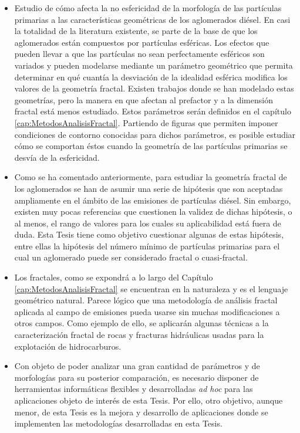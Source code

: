 \begin{itemize}
	
	\item Estudio de cómo afecta la no esfericidad de la morfología de las partículas primarias a las características geométricas de los aglomerados diésel. En casi la totalidad de la literatura existente, se parte de la base de que los aglomerados están compuestos por partículas esféricas. Los efectos que pueden llevar a que las partículas no sean perfectamente esféricos son variados y pueden modelarse mediante un parámetro geométrico que permita determinar en qué cuantía la desviación de la idealidad esférica modifica los valores de la geometría fractal. Existen trabajos donde se han modelado estas geometrías, pero la manera en que afectan al prefactor y a la dimensión fractal está menos estudiado. Estos parámetros serán definidos en el capítulo \ref{cap:MetodosAnalisisFractal}. Partiendo de figuras que permiten imponer condiciones de contorno conocidas para dichos parámetros, es posible estudiar cómo se comportan éstos cuando la geometría de las partículas primarias se desvía de la esfericidad.
	
	\item Como se ha comentado anteriormente, para estudiar la geometría fractal de los aglomerados se han de asumir una serie de hipótesis que son aceptadas ampliamente en el ámbito de las emisiones de partículas diésel. Sin embargo, existen muy pocas referencias que cuestionen la validez de dichas hipótesis, o al menos, el rango de valores para los cuales su aplicabilidad está fuera de duda. Esta Tesis tiene como objetivo cuestionar algunas de estas hipótesis, entre ellas la hipótesis del número mínimo de partículas primarias para el cual un aglomerado puede ser considerado fractal o cuasi-fractal.
	
	\item Los fractales, como se expondrá a lo largo del Capítulo \ref{cap:MetodosAnalisisFractal} se encuentran en la naturaleza y es el lenguaje geométrico natural. Parece lógico que una metodología de análisis fractal aplicada al campo de emisiones pueda usarse sin muchas modificaciones a otros campos. Como ejemplo de ello, se aplicarán algunas técnicas a la caracterización fractal de rocas y fracturas hidráulicas usadas para la explotación de hidrocarburos.
	
	\item Con objeto de poder analizar una gran cantidad de parámetros y de morfologías para su posterior comparación, es necesario disponer de herramientas informáticas flexibles y desarrolladas \textit{ad hoc} para las aplicaciones objeto de interés de esta Tesis. Por ello, otro objetivo, aunque menor, de esta Tesis es la mejora y desarrollo de aplicaciones donde se implementen las metodologías desarrolladas en esta Tesis.
	
\end{itemize}

